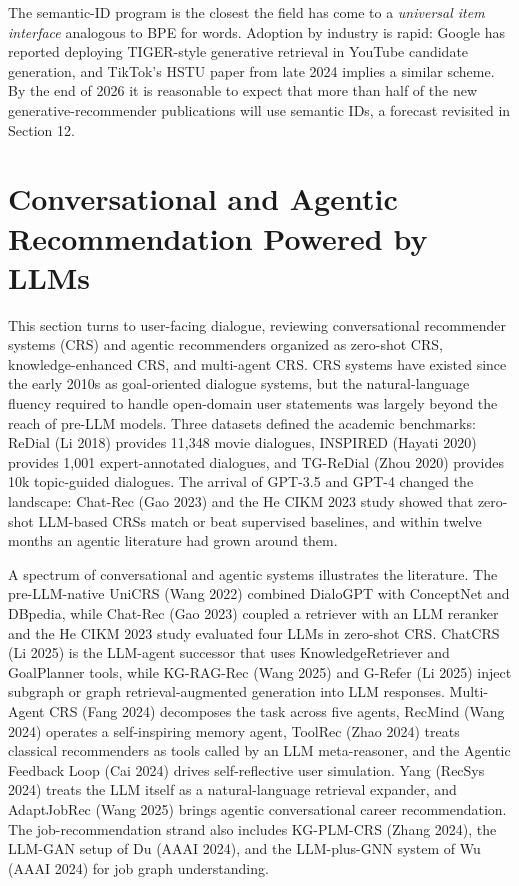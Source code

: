 The semantic-ID program is the closest the field has come to a \emph{universal item interface} analogous to BPE for words. Adoption by industry is rapid: Google has reported deploying TIGER-style generative retrieval in YouTube candidate generation, and TikTok's HSTU paper from late 2024 implies a similar scheme. By the end of 2026 it is reasonable to expect that more than half of the new generative-recommender publications will use semantic IDs, a forecast revisited in Section 12.

\section{Conversational and Agentic Recommendation Powered by LLMs}\label{conversational-and-agentic-recommendation-powered-by-llms}

This section turns to user-facing dialogue, reviewing conversational recommender systems (CRS) and agentic recommenders organized as zero-shot CRS, knowledge-enhanced CRS, and multi-agent CRS. CRS systems have existed since the early 2010s as goal-oriented dialogue systems, but the natural-language fluency required to handle open-domain user statements was largely beyond the reach of pre-LLM models. Three datasets defined the academic benchmarks: ReDial (Li 2018) provides 11,348 movie dialogues, INSPIRED (Hayati 2020) provides 1,001 expert-annotated dialogues, and TG-ReDial (Zhou 2020) provides 10k topic-guided dialogues. The arrival of GPT-3.5 and GPT-4 changed the landscape: Chat-Rec (Gao 2023) and the He CIKM 2023 study showed that zero-shot LLM-based CRSs match or beat supervised baselines, and within twelve months an agentic literature had grown around them.

A spectrum of conversational and agentic systems illustrates the literature. The pre-LLM-native UniCRS (Wang 2022) combined DialoGPT with ConceptNet and DBpedia, while Chat-Rec (Gao 2023) coupled a retriever with an LLM reranker and the He CIKM 2023 study evaluated four LLMs in zero-shot CRS. ChatCRS (Li 2025) is the LLM-agent successor that uses KnowledgeRetriever and GoalPlanner tools, while KG-RAG-Rec (Wang 2025) and G-Refer (Li 2025) inject subgraph or graph retrieval-augmented generation into LLM responses. Multi-Agent CRS (Fang 2024) decomposes the task across five agents, RecMind (Wang 2024) operates a self-inspiring memory agent, ToolRec (Zhao 2024) treats classical recommenders as tools called by an LLM meta-reasoner, and the Agentic Feedback Loop (Cai 2024) drives self-reflective user simulation. Yang (RecSys 2024) treats the LLM itself as a natural-language retrieval expander, and AdaptJobRec (Wang 2025) brings agentic conversational career recommendation. The job-recommendation strand also includes KG-PLM-CRS (Zhang 2024), the LLM-GAN setup of Du (AAAI 2024), and the LLM-plus-GNN system of Wu (AAAI 2024) for job graph understanding.

